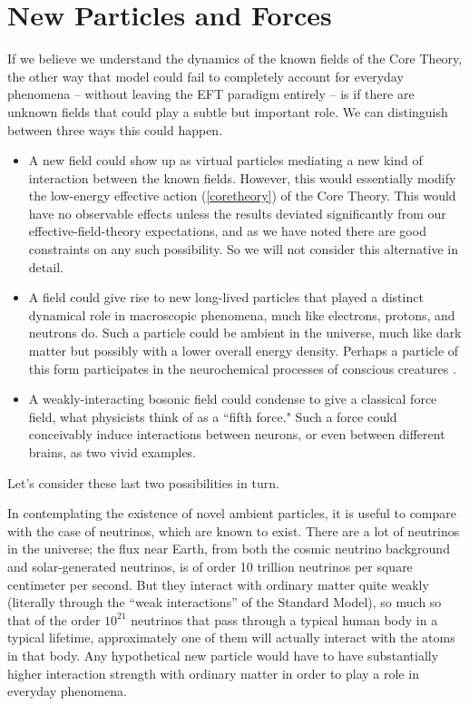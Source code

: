 \documentclass[12pt,letterpaper]{article}
\begin{document}
\section{New Particles and Forces}

If we believe we understand the dynamics of the known fields of the Core Theory, the other way that model could fail to completely account for everyday phenomena -- without leaving the EFT paradigm entirely -- is if there are unknown fields that could play a subtle but important role.
We can distinguish between three ways this could happen.
\begin{itemize}
\item A new field could show up as virtual particles mediating a new kind of interaction between the known fields.
However, this would essentially modify the low-energy effective action (\ref{coretheory}) of the Core Theory.
This would have no observable effects unless the results deviated significantly from our effective-field-theory expectations, and as we have noted there are good constraints on any such possibility.
So we will not consider this alternative in detail.
\item A field could give rise to new long-lived particles that played a distinct dynamical role in macroscopic phenomena, much like electrons, protons, and neutrons do.
Such a particle could be ambient in the universe, much like dark matter but possibly with a lower overall energy density.
Perhaps a particle of this form participates in the neurochemical processes of conscious creatures \citep{pullman2000}.
\item A weakly-interacting bosonic field could condense to give a classical force field, what physicists think of as a ``fifth force."
Such a force could conceivably induce interactions between neurons, or even between different brains, as two vivid examples.
\end{itemize}
Let's consider these last two possibilities in turn.

In contemplating the existence of novel ambient particles, it is useful to compare with the case of neutrinos, which are known to exist.
There are a lot of neutrinos in the universe; the flux near Earth, from both the cosmic neutrino background and solar-generated neutrinos, is of order 10 trillion neutrinos per square centimeter per second.
But they interact with ordinary matter quite weakly (literally through the ``weak interactions'' of the Standard Model), so much so that of the order $10^{21}$ neutrinos that pass through a typical human body in a typical lifetime, approximately one of them will actually interact with the atoms in that body.
Any hypothetical new particle would have to have substantially higher interaction strength with ordinary matter in order to play a role in everyday phenomena.
\end{document}
